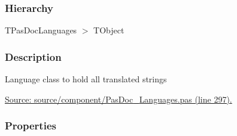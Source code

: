 \documentclass{report}
\begin{document}
\subsubsection*{\large{\textbf{Hierarchy}}\normalsize\hspace{1ex}\hfill}
TPasDocLanguages {$>$} TObject
\subsubsection*{\large{\textbf{Description}}\normalsize\hspace{1ex}\hfill}
Language class to hold all translated strings\par
\href{https://github.com/pasdoc/pasdoc/blob/master/source/component/PasDoc_Languages.pas#L297}{Source: source/component/PasDoc{\_}Languages.pas (line 297).}\subsubsection*{\large{\textbf{Properties}}\normalsize\hspace{1ex}\hfill}
\end{document}
